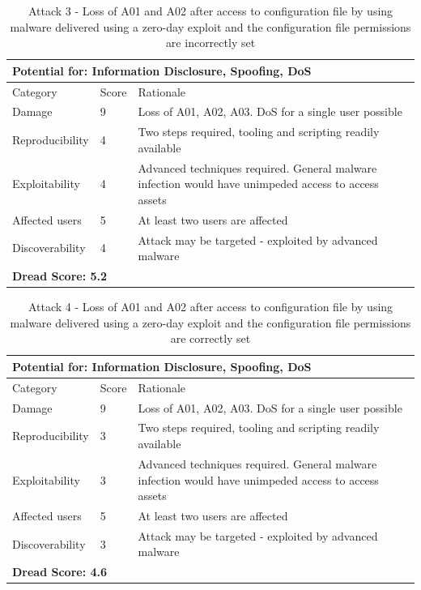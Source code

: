 \documentclass [11pt, proquest] {uwthesis}[2020/02/24]
\begin{document}
\begin{table}[H]
\label{attack3-ref}
\begin{tabular}{|m{3cm}|m{.9cm}|p{27em} |}
\multicolumn{3}{l}{Potential for: Information Disclosure, Spoofing, DoS}                   \\
\hline
Category & Score & Rationale \\
\hline
Damage          & 9     & Loss of A01, A02, A03. DoS for a single user possible            \\
\hline
Reproducibility & 4     & Two steps required, tooling and scripting readily available    \\
\hline
Exploitability & 4      & Advanced techniques required. General malware infection would have unimpeded access to access assets  \\
\hline
Affected users  & 5     & At least two users are affected                      \\
\hline
Discoverability & 4     & Attack may be targeted - exploited by advanced malware \\
\hline
\multicolumn{3}{l}{\textbf{Dread Score: 5.2}} 
\end{tabular}
\caption{Attack 3 - Loss of A01 and A02 after access to configuration file by using malware delivered using a zero-day exploit and the configuration file permissions are incorrectly set}
\end{table}

\begin{table}[H]
\label{attack4-ref}
\begin{tabular}{|m{3cm}|m{.9cm}|p{27em} |}
\multicolumn{3}{l}{Potential for: Information Disclosure, Spoofing, DoS}                   \\
\hline
Category & Score & Rationale \\
\hline
Damage          & 9     & Loss of A01, A02, A03. DoS for a single user possible            \\
\hline
Reproducibility & 3     & Two steps required, tooling and scripting readily available    \\
\hline
Exploitability & 3      & Advanced techniques required. General malware infection would have unimpeded access to access assets  \\
\hline
Affected users  & 5     & At least two users are affected                      \\
\hline
Discoverability & 3     & Attack may be targeted - exploited by advanced malware \\
\hline
\multicolumn{3}{l}{\textbf{Dread Score: 4.6}} 
\end{tabular}
\caption{Attack 4 - Loss of A01 and A02 after access to configuration file by using malware delivered using a zero-day exploit and the configuration file permissions are correctly set}
\end{table}
\end{document}
